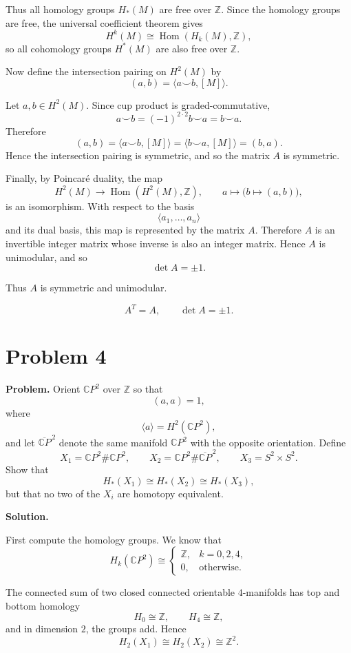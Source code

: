 \documentclass[12pt,a4paper]{article}
\theoremstyle{notespace}
\begin{document}
Thus all homology groups \(H_*(M)\) are free over \(\mathbb Z\). Since the homology
groups are free, the universal coefficient theorem gives
\[
H^k(M)\cong \operatorname{Hom}(H_k(M),\mathbb Z),
\]
so all cohomology groups \(H^*(M)\) are also free over \(\mathbb Z\).

Now define the intersection pairing on \(H^2(M)\) by
\[
(a,b)=\langle a\smile b,[M]\rangle.
\]

Let \(a,b\in H^2(M)\). Since cup product is graded-commutative,
\[
a\smile b=(-1)^{2\cdot 2}b\smile a=b\smile a.
\]
Therefore
\[
(a,b)=\langle a\smile b,[M]\rangle
=\langle b\smile a,[M]\rangle
=(b,a).
\]
Hence the intersection pairing is symmetric, and so the matrix \(A\) is symmetric.

Finally, by Poincaré duality, the map
\[
H^2(M)\longrightarrow \operatorname{Hom}(H^2(M),\mathbb Z),
\qquad
a\longmapsto \bigl(b\mapsto (a,b)\bigr),
\]
is an isomorphism. With respect to the basis
\[
\langle a_1,\ldots,a_n\rangle
\]
and its dual basis, this map is represented by the matrix \(A\). Therefore \(A\) is
an invertible integer matrix whose inverse is also an integer matrix. Hence \(A\) is
unimodular, and so
\[
\det A=\pm 1.
\]

Thus \(A\) is symmetric and unimodular.

\[
\boxed{A^T=A,\qquad \det A=\pm 1.}
\]

\section{Problem 4}

\textbf{Problem.}
Orient \(\mathbb CP^2\) over \(\mathbb Z\) so that
\[
(a,a)=1,
\]
where
\[
\langle a\rangle=H^2(\mathbb CP^2),
\]
and let \(\overline{\mathbb CP}^{\,2}\) denote the same manifold \(\mathbb CP^2\) with
the opposite orientation. Define
\[
X_1=\mathbb CP^2\#\mathbb CP^2,
\qquad
X_2=\mathbb CP^2\#\overline{\mathbb CP}^{\,2},
\qquad
X_3=S^2\times S^2.
\]
Show that
\[
H_*(X_1)\cong H_*(X_2)\cong H_*(X_3),
\]
but that no two of the \(X_i\) are homotopy equivalent.

\medskip

\noindent\textbf{Solution.}

First compute the homology groups. We know that
\[
H_k(\mathbb CP^2)\cong
\begin{cases}
	\mathbb Z, & k=0,2,4,\\
	0, & \text{otherwise}.
\end{cases}
\]

The connected sum of two closed connected orientable \(4\)-manifolds has top and
bottom homology
\[
H_0\cong \mathbb Z,
\qquad
H_4\cong \mathbb Z,
\]
and in dimension \(2\), the groups add. Hence
\[
H_2(X_1)\cong H_2(X_2)\cong \mathbb Z^2.
\]
\end{document}
